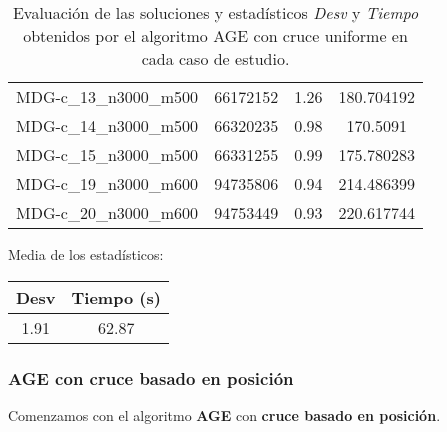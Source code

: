 \documentclass{article}
\begin{document}
\begin{table}[H]
\begin{tabular}{|cccc|}
		MDG-c\_13\_n3000\_m500 & 66172152 & 1.26 & 180.704192\\
		MDG-c\_14\_n3000\_m500 & 66320235 & 0.98 & 170.5091\\
		MDG-c\_15\_n3000\_m500 & 66331255 & 0.99 & 175.780283\\
		MDG-c\_19\_n3000\_m600 & 94735806 & 0.94 & 214.486399\\
		MDG-c\_20\_n3000\_m600 & 94753449 & 0.93 & 220.617744\\
		\hline
	\end{tabular}
	\caption{Evaluación de las soluciones y estadísticos \emph{Desv} y \emph{Tiempo} obtenidos por el algoritmo AGE con cruce uniforme
		en cada caso de estudio.}
	\label{tab:age-uniforme}
\end{table}

Media de los estadísticos:
\begin{table}[H]
	\centering
	\begin{tabular}{|cc|}
		\hline
		Desv & Tiempo (s)\\ \hline
		1.91 & 62.87 \\
		\hline
	\end{tabular}
\end{table}

\pagebreak

\subsubsection*{AGE con cruce basado en posición}

Comenzamos con el algoritmo \textbf{AGE} con \textbf{cruce basado en posición}.
\end{document}
